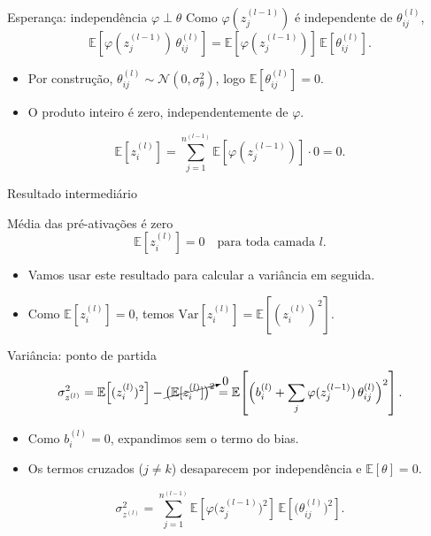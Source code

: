 \documentclass[aspectratio=169,xcolor=dvipsnames]{beamer}
\begin{document}
  \begin{frame}{Esperança: independência $\varphi\perp\theta$}
    Como $\varphi(z^{(l-1)}_j)$ é independente de $\theta^{(l)}_{ij}$,
    \[
      \mathbb{E}\!\left[\varphi(z^{(l-1)}_j)\,\theta^{(l)}_{ij}\right]
        = \mathbb{E}[\varphi(z^{(l-1)}_j)]\,\mathbb{E}[\theta^{(l)}_{ij}].
    \]
    \begin{itemize}
      \item Por construção, $\theta^{(l)}_{ij}\sim\mathcal{N}(0,\sigma_\theta^2)$, logo
        $\mathbb{E}[\theta^{(l)}_{ij}] = 0$.
      \item O produto inteiro é zero, independentemente de $\varphi$.
    \end{itemize}
    \[
      \mathbb{E}[z^{(l)}_i] = \sum_{j=1}^{n^{(l-1)}} \mathbb{E}[\varphi(z^{(l-1)}_j)] \cdot 0 = 0.
    \]
  \end{frame}

  \begin{frame}{Resultado intermediário}
    \begin{block}{Média das pré-ativações é zero}
      \[
        \mathbb{E}[z^{(l)}_i] = 0 \quad\text{para toda camada } l.
      \]
    \end{block}
    \vfill
    \begin{itemize}
      \item Vamos usar este resultado para calcular a variância em seguida.
      \item Como $\mathbb{E}[z^{(l)}_i]=0$, temos $\mathrm{Var}[z^{(l)}_i] = \mathbb{E}[(z^{(l)}_i)^2]$.
    \end{itemize}
  \end{frame}


  \begin{frame}{Variância: ponto de partida}
    \[
      \sigma^2_{z^{(l)}}
        = \mathbb{E}\!\left[(z^{(l)}_i)^2\right] - \cancelto{0}{\big(\mathbb{E}[z^{(l)}_i]\big)^2}
        = \mathbb{E}\!\left[\Big(b^{(l)}_i + \sum_{j} \varphi(z^{(l-1)}_j)\,\theta^{(l)}_{ij}\Big)^2\right].
    \]
    \begin{itemize}
      \item Como $b^{(l)}_i = 0$, expandimos sem o termo do bias.
      \item Os termos cruzados ($j\neq k$) desaparecem por independência
        e $\mathbb{E}[\theta]=0$.
    \end{itemize}
    \[
      \sigma^2_{z^{(l)}}
        = \sum_{j=1}^{n^{(l-1)}} \mathbb{E}\!\left[\varphi\!\big(z^{(l-1)}_j\big)^2\right]\,
                                 \mathbb{E}\!\left[\big(\theta^{(l)}_{ij}\big)^2\right].
    \]
  \end{frame}
\end{document}
